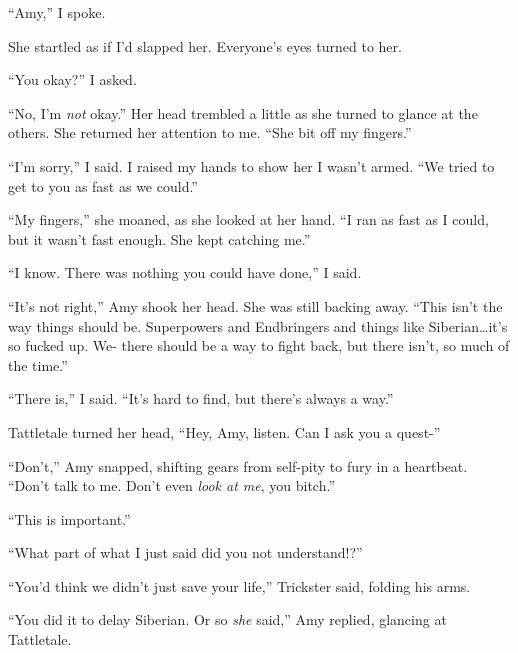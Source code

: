 ``Amy,'' I spoke.



She startled as if I'd slapped her.  Everyone's eyes turned to her.



``You okay?''  I asked.



``No, I'm \emph{not} okay.''  Her head trembled a little as she turned to glance at the others.  She returned her attention to me.  ``She bit off my fingers.''



``I'm sorry,'' I said.  I raised my hands to show her I wasn't armed.  ``We tried to get to you as fast as we could.''



``My fingers,'' she moaned, as she looked at her hand.  ``I ran as fast as I could, but it wasn't fast enough.  She kept catching me.''



``I know.  There was nothing you could have done,'' I said.



``It's not right,'' Amy shook her head.  She was still backing away. ``This isn't the way things should be.  Superpowers and Endbringers and things like Siberian\ldots it's so fucked up.  We- there should be a way to fight back, but there isn't, so much of the time.''



``There is,'' I said.  ``It's hard to find, but there's always a way.''



Tattletale turned her head, ``Hey, Amy, listen.  Can I ask you a quest-''



``Don't,'' Amy snapped, shifting gears from self-pity to fury in a heartbeat.  ``Don't talk to me.  Don't even \emph{look at me}, you bitch.''



``This is important.''



``What part of what I just said did you not understand!?''



``You'd think we didn't just save your life,'' Trickster said, folding his arms.



``You did it to delay Siberian.  Or so\emph{ she }said,'' Amy replied, glancing at Tattletale.



